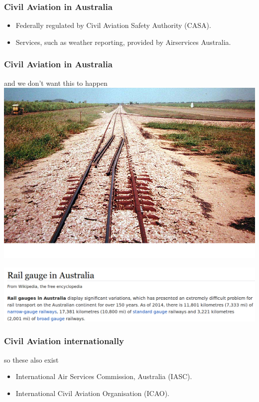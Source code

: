 \begin{frame}
\frametitle{Civil Aviation in Australia}
\begin{itemize}
\item<1-> Federally regulated by Civil Aviation Safety Authority (CASA).
\item<2-> Services, such as weather reporting, provided by Airservices
          Australia.
\end{itemize}
\end{frame}

\begin{frame}
\frametitle{Civil Aviation in Australia}
\begin{block}{and we don't want this to happen}
\includegraphics[height=0.5\textheight]{image/railway-gauge.png}
\end{block}
\begin{block}{}
\includegraphics[height=0.2\textheight]{image/railway-gauge-wikipedia.png}
\end{block}
\end{frame}

\begin{frame}
\frametitle{Civil Aviation internationally}
\begin{block}{so these also exist}
\begin{itemize}
\item<1-> International Air Services Commission, Australia (IASC).
\item<2-> International Civil Aviation Organisation (ICAO).
\end{itemize}
\end{block}
\end{frame}

